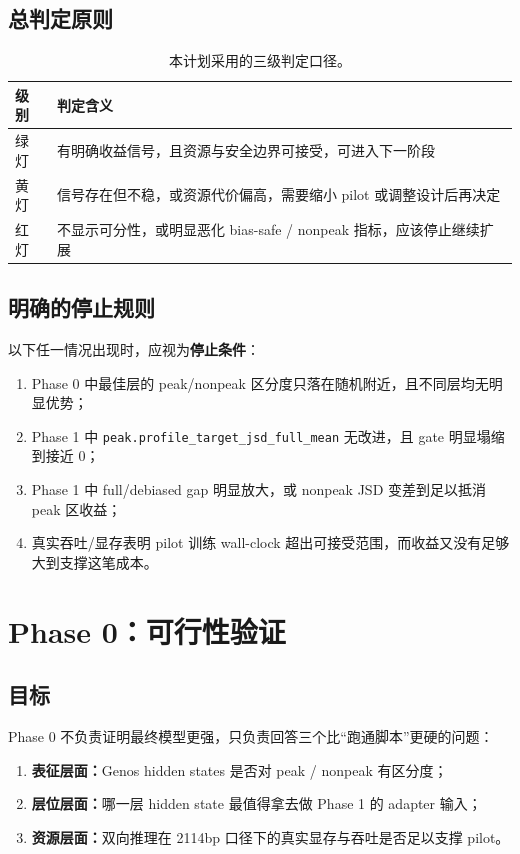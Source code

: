 \documentclass[11pt,a4paper]{ctexart}
\begin{document}
\subsection{总判定原则}

\begin{table}[H]
\centering
\small
\caption{本计划采用的三级判定口径。}
\label{tab:decision_rule}
\begin{tabularx}{\textwidth}{l Y}
\toprule
级别 & 判定含义 \\
\midrule
绿灯 & 有明确收益信号，且资源与安全边界可接受，可进入下一阶段 \\
黄灯 & 信号存在但不稳，或资源代价偏高，需要缩小 pilot 或调整设计后再决定 \\
红灯 & 不显示可分性，或明显恶化 bias-safe / nonpeak 指标，应该停止继续扩展 \\
\bottomrule
\end{tabularx}
\end{table}

\subsection{明确的停止规则}

以下任一情况出现时，应视为\textbf{停止条件}：

\begin{enumerate}[leftmargin=2em]
  \item Phase 0 中最佳层的 peak/nonpeak 区分度只落在随机附近，且不同层均无明显优势；
  \item Phase 1 中 \texttt{peak.profile\_target\_jsd\_full\_mean} 无改进，且 gate 明显塌缩到接近 0；
  \item Phase 1 中 full/debiased gap 明显放大，或 nonpeak JSD 变差到足以抵消 peak 区收益；
  \item 真实吞吐/显存表明 pilot 训练 wall-clock 超出可接受范围，而收益又没有足够大到支撑这笔成本。
\end{enumerate}

\section{Phase 0：可行性验证}

\subsection{目标}

Phase 0 不负责证明最终模型更强，只负责回答三个比“跑通脚本”更硬的问题：

\begin{enumerate}[leftmargin=2em]
  \item \textbf{表征层面：}Genos hidden states 是否对 peak / nonpeak 有区分度；
  \item \textbf{层位层面：}哪一层 hidden state 最值得拿去做 Phase 1 的 adapter 输入；
  \item \textbf{资源层面：}双向推理在 2114bp 口径下的真实显存与吞吐是否足以支撑 pilot。
\end{enumerate}
\end{document}
